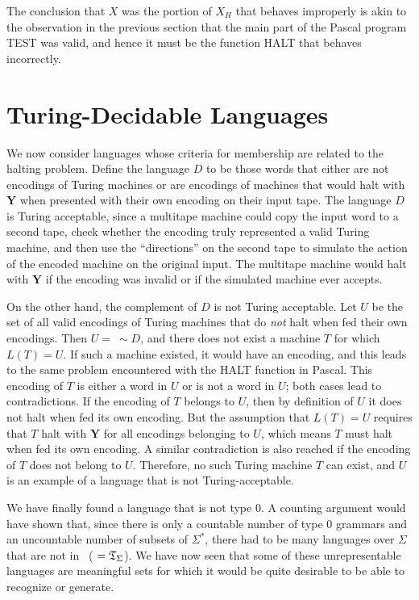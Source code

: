 The conclusion that $X$ was the portion of $X_H$ that behaves improperly is akin
to the observation in the previous section that the main part of the Pascal
program TEST was valid, and hence it must be the function HALT that behaves
incorrectly.

\section{Turing-Decidable Languages}\label{sec-12.5}

We now consider languages whose criteria for membership are related to the
halting problem. Define the language $D$ to be those words that either are not
encodings of Turing machines or are encodings of machines that would halt with
$\pmb{Y}$ when presented with their own encoding on their input tape. The
language $D$ is Turing acceptable, since a multitape machine could copy the
input word to a second tape, check whether the encoding truly represented a
valid Turing machine, and then use the ``directions'' on the second tape to
simulate the action of the encoded machine on the original input. The multitape
machine would halt with $\pmb{Y}$ if the encoding was invalid or if the
simulated machine ever accepts.

On the other hand, the complement of $D$ is not Turing acceptable. Let $U$ be
the set of all valid encodings of Turing machines that do \emph{not} halt when
fed their own encodings. Then $U=\ \sim  D$, and there does not exist a
machine $T$ for which $L(T)=U$. If such a machine existed, it would have an
encoding, and this leads to the same problem encountered with the HALT function
in Pascal. This encoding of $T$ is either a word in $U$ or is not a word in $U$;
both cases lead to contradictions. If the encoding of $T$ belongs to $U$, then
by definition of $U$ it does not halt when fed its own encoding. But the
assumption that $L(T)=U$ requires that $T$ halt with $\pmb{Y}$ for all encodings
belonging to $U$, which means $T$ must halt when fed its own encoding. A similar
contradiction is also reached if the encoding of $T$ does not belong to $U$.
Therefore, no such Turing machine $T$ can exist, and $U$ is an example of a
language that is not Turing-acceptable.

We have finally found a language that is not type 0. A counting argument would
have shown that, since there is only a countable number of type 0 grammars and
an uncountable number of subsets of $\Sigma^*$, there had to be many languages
over $\Sigma$ that are not in \ZSIG\ ( $=\mathfrak{T}_\Sigma$). We have now seen that some of these
unrepresentable languages are meaningful sets for which it would be quite
desirable to be able to recognize or generate.

